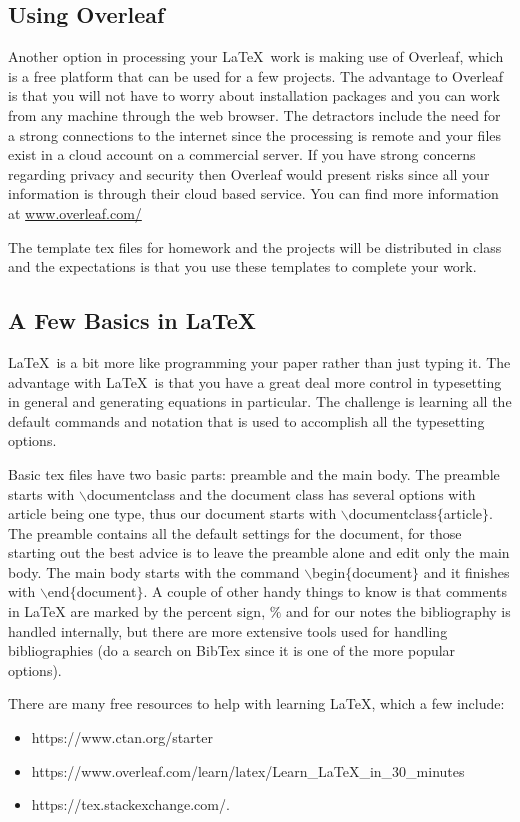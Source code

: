 \documentclass[twoside]{article}
\begin{document}
\subsection{Using Overleaf}
Another option in processing your \LaTeX \  work  is making use of Overleaf, which is a free platform that can be used for a few projects. The advantage to Overleaf is that you will not have to worry about installation packages and you can work from any machine through the web browser. The detractors include the need for a strong connections to the internet since the processing is remote  and your files exist in a cloud account on a commercial server. If you have strong concerns regarding privacy and security then Overleaf would present risks since all your information is through their cloud based service. You can find more information at \href{https://www.overleaf.com/}{www.overleaf.com/} \medskip \par

The template tex files for homework and the projects will be distributed in class and the expectations is that you use these templates to complete your work. 

\subsection{A Few Basics in \LaTeX }
\LaTeX \ is a bit more like programming your paper rather than just typing it. The advantage with \LaTeX \ is that you have a great deal more control in typesetting in general and generating equations in particular. The challenge is learning all the default commands and notation that is used to accomplish all the typesetting options. \par
Basic tex files have two basic parts: preamble and the main body. The preamble starts with $\backslash$documentclass and the document class has several options with article being one type, thus our document starts with $\backslash$documentclass$\{$article$\}$. The preamble contains all the default settings for the document, for those starting out the best advice is to leave the preamble alone and edit only the main body. The main body starts with the command $\backslash$begin$\{$document$\}$ and it finishes with $\backslash$end$\{$document$\}$. A couple of other handy things to know is that comments in LaTeX are marked by the percent sign, $\%$ and for our notes the bibliography is handled internally, but there are more extensive tools used for handling bibliographies (do a search on BibTex since it is one of the more popular options). \par 
There are many free resources to help with learning \LaTeX, which a few include:
\begin{itemize}
\item https://www.ctan.org/starter
\item https://www.overleaf.com/learn/latex/Learn\_LaTeX\_in\_30\_minutes
\item https://tex.stackexchange.com/.
\end{itemize}
\end{document}
